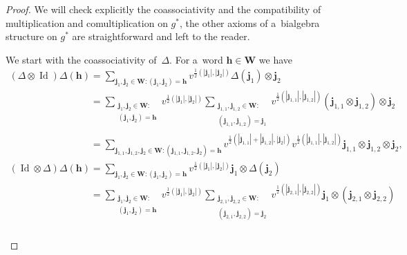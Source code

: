 \begin{proof}
We will check explicitly the coassociativity and the compatibility of multiplication and comultiplication on $g^*$, the
other axioms of a~bialgebra structure on $g^*$ are straightforward and left to the reader.

We start with the coassociativity of~$\Delta$.
For a~word $\mathbf{h}\in\mathbf{W}$ we have
\begin{gather*}
(\Delta\otimes\operatorname{Id})\Delta(\mathbf{h})
=\sum\limits_{\mathbf{j}_1,\mathbf{j}_2\in\mathbf{W}:(\mathbf{j}_1,\mathbf{j}_2)=\mathbf{h}}
v^{\frac{1}{2}(|\mathbf{j}_1|,|\mathbf{j}_2|)}\Delta(\mathbf{j}_1)
\otimes\mathbf{j}_2
\\
\phantom{(\Delta\otimes\operatorname{Id})\Delta(\mathbf{h})}
=\sum\limits_{\substack{\mathbf{j}_1,\mathbf{j}_2\in\mathbf{W}:\\(\mathbf{j}_1,\mathbf{j}_2)=\mathbf{h}}}
v^{\frac{1}{2}(|\mathbf{j}_1|,|\mathbf{j}_2|)}
\sum\limits_{\substack{\mathbf{j}_{1,1},\mathbf{j}_{1,2}\in\mathbf{W}:\\(\mathbf{j}_{1,1},\mathbf{j}_{1,2})=\mathbf{j}_1}}
v^{\frac{1}{2}(|\mathbf{j}_{1,1}|,|\mathbf{j}_{1,2}|)}(\mathbf{j}_{1,1}\otimes\mathbf{j}_{1,2})
\otimes\mathbf{j}_2
\\
\phantom{(\Delta\otimes\operatorname{Id})\Delta(\mathbf{h})}
=\sum\limits_{\mathbf{j}_{1,1},\mathbf{j}_{1,2},\mathbf{j}_2\in\mathbf{W}:(\mathbf{j}_{1,1},\mathbf{j}_{1,2},\mathbf{j}_2)=\mathbf{h}}
v^{\frac{1}{2}(|\mathbf{j}_{1,1}|+|\mathbf{j}_{1,2}|,|\mathbf{j}_2|)}
v^{\frac{1}{2}(|\mathbf{j}_{1,1}|,|\mathbf{j}_{1,2}|)}\mathbf{j}_{1,1}\otimes\mathbf{j}_{1,2}\otimes\mathbf{j}_2,
\\
(\operatorname{Id}\otimes\Delta)\Delta(\mathbf{h})
=\sum\limits_{\mathbf{j}_1,\mathbf{j}_2\in\mathbf{W}:(\mathbf{j}_1,\mathbf{j}_2)=\mathbf{h}}
v^{\frac{1}{2}(|\mathbf{j}_1|,|\mathbf{j}_2|)}\mathbf{j}_1\otimes\Delta(\mathbf{j}_2)
\\
\phantom{(\operatorname{Id}\otimes\Delta)\Delta(\mathbf{h})}
=\sum\limits_{\substack{\mathbf{j}_1,\mathbf{j}_2\in\mathbf{W}:\\(\mathbf{j}_1,\mathbf{j}_2)=\mathbf{h}}}
v^{\frac{1}{2}(|\mathbf{j}_1|,|\mathbf{j}_2|)}
\sum\limits_{\substack{\mathbf{j}_{2,1},\mathbf{j}_{2,2}\in\mathbf{W}:\\(\mathbf{j}_{2,1},\mathbf{j}_{2,2})=\mathbf{j}_2}}
v^{\frac{1}{2}(|\mathbf{j}_{2,1}|,|\mathbf{j}_{2,2}|)}\mathbf{j}_1\otimes(\mathbf{j}_{2,1}\otimes\mathbf{j}_{2,2})
\\
\phantom{(\operatorname{Id}\otimes\Delta)\Delta(\mathbf{h})}

\end{gather*}
\end{proof}
